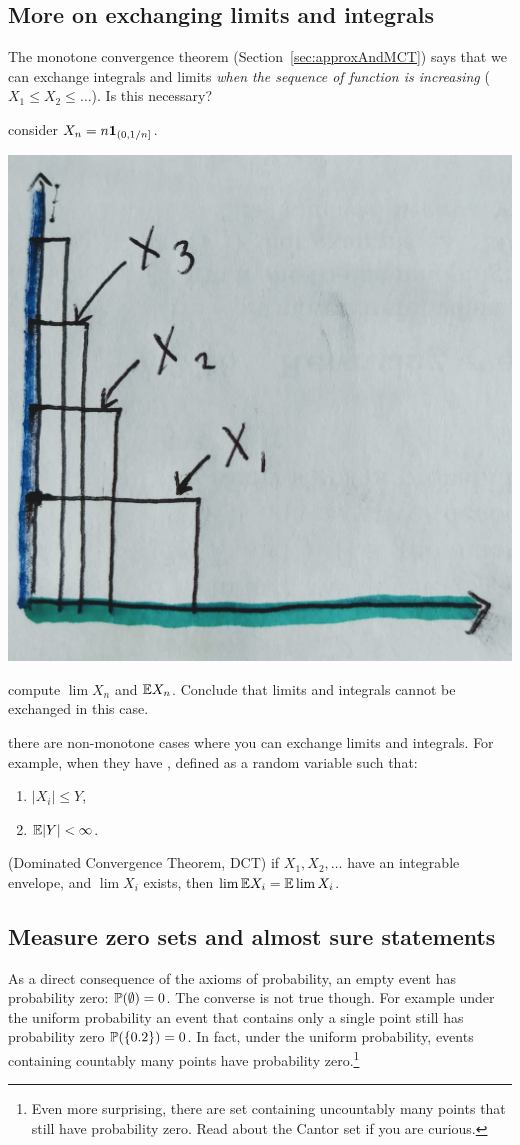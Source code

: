 \documentclass{article}
\begin{document}
\subsection{More on exchanging limits and integrals}\label{sec:exchange-lim}

The monotone convergence theorem (Section~\ref{sec:approxAndMCT}) says that we can exchange integrals and limits \emph{when the sequence of function is increasing} ($X_1 \le X_2 \le \dots$). Is this necessary?

 consider $X_n = n \1_{(0, 1/n]}$. 
\begin{center}
	\includegraphics[width=0.4\linewidth]{figures/limit-exchange-warn}
\end{center}

 compute $\lim X_n$ and $\E X_n$. Conclude that limits and integrals cannot be exchanged in this case.

 there are non-monotone cases where you can exchange limits and integrals. For example, when they have , defined as a random variable such that:
\begin{enumerate}
  \item $|X_i| \le Y$,
  \item $\E|Y| < \infty$.
\end{enumerate}

 (Dominated Convergence Theorem, DCT) if $X_1, X_2, \dots$ have an integrable envelope, and $\lim X_i$ exists, then $\lim \E X_i = \E \lim X_i$.


\subsection{Measure zero sets and almost sure statements}

As a direct consequence of the axioms of probability, an empty event has probability zero: $\P(\emptyset) = 0$. The converse is not true though. For example under the uniform probability an event that contains only a single point still has probability zero $\P(\{0.2\}) = 0$. In fact, under the uniform probability, events containing countably many points have probability zero.\footnote{Even more surprising, there are set containing uncountably many points that still have probability zero. Read about the Cantor set if you are curious.} 
\end{document}
